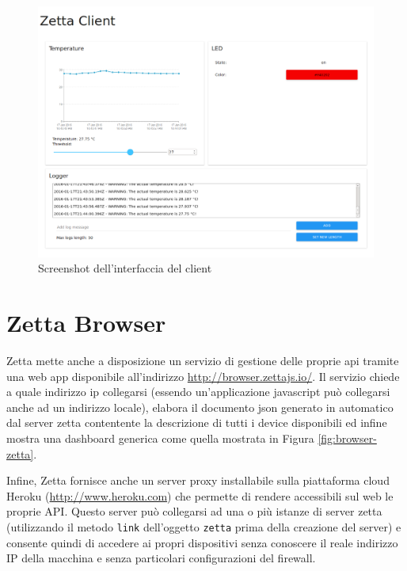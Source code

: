 \documentclass[]{scrartcl}
\begin{document}
\begin{figure}[h]
\centering
\includegraphics[scale=0.25]{client-screen.png}
\caption{Screenshot dell'interfaccia del client}
\label{fig:client-screen}
\end{figure}

\section{Zetta Browser}
Zetta mette anche a disposizione un servizio di gestione delle proprie api tramite una web app disponibile all'indirizzo \url{http://browser.zettajs.io/}. Il servizio chiede a quale indirizzo ip collegarsi (essendo un'applicazione javascript può collegarsi anche ad un indirizzo locale), elabora il documento json generato in automatico dal server zetta contentente la descrizione di tutti i device disponibili ed infine mostra una dashboard generica come quella mostrata in Figura \ref{fig:browser-zetta}. 

Infine, Zetta fornisce anche un server proxy installabile sulla piattaforma cloud Heroku (\url{http://www.heroku.com}) che permette di rendere accessibili sul web le proprie API. Questo server può collegarsi ad una o più istanze di server zetta (utilizzando il metodo \texttt{link} dell'oggetto \texttt{zetta} prima della creazione del server) e consente quindi di accedere ai propri dispositivi senza conoscere il reale indirizzo IP della macchina e senza particolari configurazioni del firewall.
\end{document}
